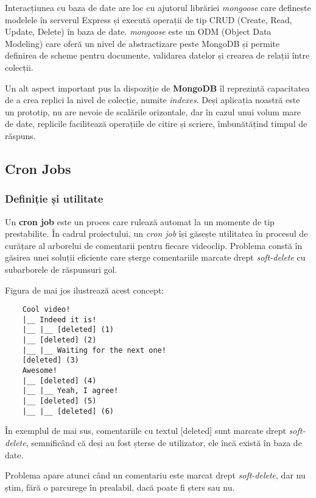 \par
Interacțiunea cu baza de date are loc cu ajutorul librăriei \textit{mongoose} care definește modelele
în serverul Express și execută operații de tip CRUD (Create, Read, Update, Delete) în baza de date.
\textit{mongoose} este un ODM (Object Data Modeling) care oferă un nivel de abstractizare peste MongoDB
și permite definirea de scheme pentru documente, validarea datelor și crearea de relații între colecții.

\par
Un alt aspect important pus la dispoziție de \textbf{MongoDB} îl reprezintă capacitatea de a crea replici
la nivel de colecție, numite \textit{indexes}. Deși aplicația noastră este un prototip, nu are nevoie 
de scalările orizontale, dar în cazul unui volum mare de date, replicile facilitează operațiile de
citire și scriere, îmbunătățind timpul de răspuns.

\subsection{Cron Jobs}
\label{sec:cron-jobs}
\subsubsection{Definiție și utilitate}
Un \textbf{cron job} este un proces care rulează automat la un momente de tip prestabilite. În cadrul proiectului,
un \textit{cron job} își găsește utilitatea în procesul de curățare al arborelui de comentarii pentru fiecare 
videoclip. Problema constă în găsirea unei soluții eficiente care șterge comentariile marcate drept \textit{soft-delete}
cu subarborele de răspunsuri gol.
\par
Figura de mai jos ilustrează acest concept:
\begin{verbatim}
    Cool video!
    |__ Indeed it is!
    |__ |__ [deleted] (1)
    |__ [deleted] (2)
    |__ |__ Waiting for the next one!
    [deleted] (3)
    Awesome!
    |__ [deleted] (4)
    |__ |__ Yeah, I agree!
    |__ [deleted] (5)
    |__ |__ [deleted] (6)
\end{verbatim}

\par
În exemplul de mai sus, comentariile cu textul [deleted] sunt marcate drept \textit{soft-delete}, semnificând că
deși au fost șterse de utilizator, ele încă există în baza de date. 
\par
Problema apare atunci când un comentariu este marcat drept \textit{soft-delete}, dar nu știm, fără o parcurege în 
prealabil, dacă poate fi șters sau nu.


